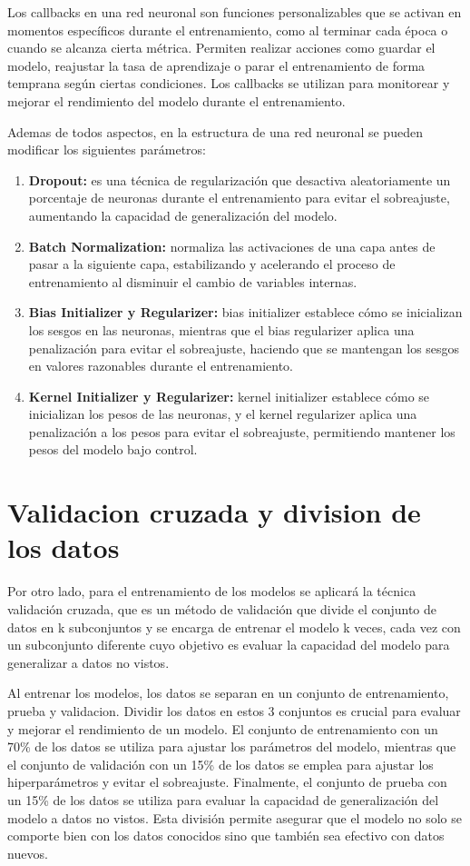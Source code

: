 Los callbacks en una red neuronal son funciones personalizables que se activan en momentos específicos durante el entrenamiento, como al terminar cada época o cuando se alcanza cierta métrica. Permiten realizar acciones como guardar el modelo, reajustar la tasa de aprendizaje o parar el entrenamiento de forma temprana según ciertas condiciones. Los callbacks se utilizan para monitorear y mejorar el rendimiento del modelo durante el entrenamiento.

Ademas de todos aspectos, en la estructura de una red neuronal se pueden modificar los siguientes parámetros:
\begin{enumerate}
    \item \textbf{Dropout:}
es una técnica de regularización que desactiva aleatoriamente un porcentaje de neuronas durante el entrenamiento para evitar el sobreajuste, aumentando la capacidad de generalización del modelo.

\item \textbf{Batch Normalization:}
normaliza las activaciones de una capa antes de pasar a la siguiente capa, estabilizando y acelerando el proceso de entrenamiento al disminuir el cambio de variables internas.

\item \textbf{Bias Initializer y Regularizer:}
bias initializer establece cómo se inicializan los sesgos en las neuronas, mientras que el bias regularizer aplica una penalización para evitar el sobreajuste, haciendo que se mantengan los sesgos en valores razonables durante el entrenamiento.

\item \textbf{Kernel Initializer y Regularizer:}
kernel initializer establece cómo se inicializan los pesos de las neuronas, y el kernel regularizer aplica una penalización a los pesos para evitar el sobreajuste, permitiendo mantener los pesos del modelo bajo control.
\end{enumerate}

\section{Validacion cruzada y division de los datos}
Por otro lado, para el entrenamiento de los modelos se aplicará la técnica validación cruzada, que es un método de validación que divide el conjunto de datos en k subconjuntos y se encarga de entrenar el modelo k veces, cada vez con un subconjunto diferente cuyo objetivo es evaluar la capacidad del modelo para generalizar a datos no vistos.

Al entrenar los modelos, los datos se separan en un conjunto de entrenamiento, prueba y validacion. Dividir los datos en estos 3 conjuntos es crucial para evaluar y mejorar el rendimiento de un modelo. El conjunto de entrenamiento con un 70\% de los datos se utiliza para ajustar los parámetros del modelo, mientras que el conjunto de validación con un 15\% de los datos se emplea para ajustar los hiperparámetros y evitar el sobreajuste. Finalmente, el conjunto de prueba con un 15\% de los datos se utiliza para evaluar la capacidad de generalización del modelo a datos no vistos. Esta división permite asegurar que el modelo no solo se comporte bien con los datos conocidos sino que también sea efectivo con datos nuevos.


